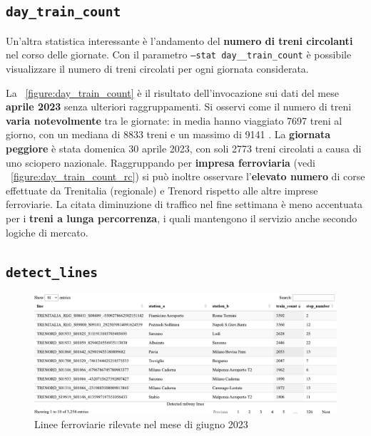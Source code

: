\documentclass[12pt,italian]{report}
\begin{document}
\subsection{\texttt{day\_train\_count}}

Un'altra statistica interessante è l'andamento del \textbf{numero di
    treni circolanti} nel corso delle giornate.  Con il parametro
\texttt{--stat day\_\-\_train\_\-count} è possibile visualizzare il
numero di treni circolati per ogni giornata considerata.

La \figurename~\ref{figure:day_train_count} è il risultato
dell'invocazione sui dati del mese \textbf{aprile 2023} senza
ulteriori raggruppamenti.  Si osservi come il numero di treni
\textbf{varia notevolmente} tra le giornate: in media hanno viaggiato
7697 treni al giorno, con un mediana di 8833 treni e un massimo di
9141 \cite[D]{StatJup}.  La \textbf{giornata peggiore} è stata
domenica 30 aprile 2023, con soli 2773 treni circolati a causa di uno
sciopero nazionale.  Raggruppando per \textbf{impresa ferroviaria}
(vedi \figurename~\ref{figure:day_train_count_rc}) si può inoltre
osservare l'\textbf{elevato numero} di corse effettuate da Trenitalia
(regionale) e Trenord rispetto alle altre imprese ferroviarie.  La
citata diminuzione di traffico nel fine settimana è meno accentuata
per i \textbf{treni a lunga percorrenza}, i quali mantengono il
servizio anche secondo logiche di mercato.

\subsection{\texttt{detect\_lines}}

\begin{figure}[h]
    \includegraphics[width=1\textwidth]{images/detect_lines.pdf}
    \caption{Linee ferroviarie rilevate nel mese di giugno 2023}
    \label{figure:detect_lines}
\end{figure}
\end{document}
